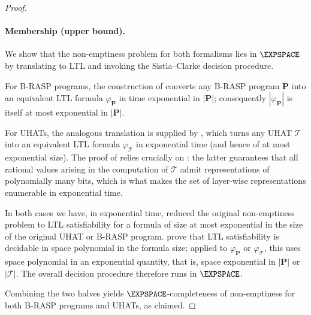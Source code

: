 \documentclass{article} %
\newcommand{\trans}{\mathcal{T}}
\newcommand{\brasp}{\boldsymbol{P}}
\begin{document}
\begin{proof}
\paragraph{Membership (upper bound).}
We show that the non-emptiness problem for both formalisms lies in $\EXPSPACE$ by translating to LTL and invoking the Sistla--Clarke decision procedure.

For B-RASP programs, the construction of \citet{YangCA24} converts any B-RASP program $\brasp$ into an equivalent LTL formula $\varphi_{\brasp}$ in time exponential in $|\brasp|$; consequently $|\varphi_{\brasp}|$ is itself at most exponential in $|\brasp|$.

For UHATs, the analogous translation is supplied by , which turns any UHAT $\trans$ into an equivalent LTL formula $\varphi_\trans$ in exponential time (and hence of at most exponential size). The proof of  relies crucially on : the latter guarantees that all rational values arising in the computation of $\trans$ admit representations of polynomially many bits, which is what makes the set of layer-wise representations enumerable in exponential time.

In both cases we have, in exponential time, reduced the original non-emptiness problem to LTL satisfiability for a formula of size at most exponential in the size of the original UHAT or B-RASP program.
\citet{SistlaC85} prove that LTL satisfiability is decidable in space polynomial in the formula size; applied to $\varphi_{\brasp}$ or $\varphi_\trans$, this uses space polynomial in an exponential quantity, that is, space exponential in $|\brasp|$ or $|\trans|$. The overall decision procedure therefore runs in $\EXPSPACE$.

Combining the two halves yields $\EXPSPACE$-completeness of non-emptiness for both B-RASP programs and UHATs, as claimed.
\end{proof}
\end{document}
